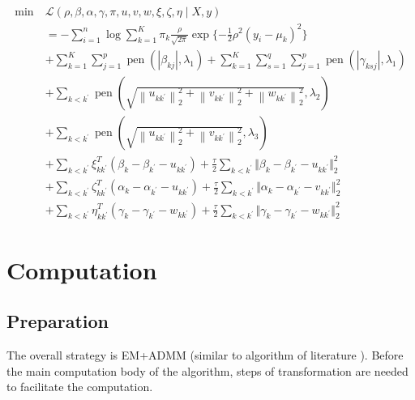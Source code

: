 \documentclass[12pt, a4paper, oneside]{article}
\numberwithin{equation}{section}
\begin{document}
\begin{equation}
	\label{eq:opt-unconstrain}
	\begin{aligned}
		\operatorname{min}\ &\mathcal{L}(\rho, \beta, \alpha, \gamma, \pi, u, v, w, \xi, \zeta, \eta \mid X, y) \\
		&=-\sum_{i=1}^{n} \log \sum_{k=1}^{K} \pi_{k} \frac{\rho}{\sqrt{2\pi}} \exp\{-\frac{1}{2}\rho^2(y_i - \mu_k)^2\} \\
		&+\sum_{k=1}^{K} \sum_{j=1}^{p} \operatorname{pen}\left(\left|\beta_{kj}\right|, \lambda_{1}\right)+\sum_{k=1}^{K} \sum_{s=1}^{q} \sum_{j=1}^{p} \operatorname{pen}\left(\left|\gamma_{ksj}\right|, \lambda_{1}\right) \\
		&+\sum_{k<k^{\prime}} \operatorname{pen}\left(\sqrt{\left\|u_{k{k^\prime}}\right\|_{2}^{2}+\left\|v_{k{k^\prime}}\right\|_{2}^{2}+\left\|w_{k{k^\prime}}\right\|_{2}^{2}}, \lambda_{2}\right) \\
		&+\sum_{k<k^{\prime}} \operatorname{pen}\left(\sqrt{\left\|u_{k{k^\prime}}\right\|_{2}^{2}+\left\|v_{k{k^\prime}}\right\|_{2}^{2}}, \lambda_{3}\right) \\ 
		&+\sum_{k<k^{\prime}}\xi_{k{k^\prime}}^T(\beta_k - \beta_{k^\prime} - u_{k{k^\prime}}) + \frac{\tau}{2}\sum_{k<k^{\prime}}\Vert\beta_k - \beta_{k^\prime} - u_{k{k^\prime}}\Vert_2^2 \\
		&+\sum_{k<k^{\prime}}\zeta_{k{k^\prime}}^T(\alpha_k - \alpha_{k^\prime} - u_{k{k^\prime}}) + \frac{\tau}{2}\sum_{k<k^{\prime}}\Vert\alpha_k - \alpha_{k^\prime} - v_{k{k^\prime}}\Vert_2^2 \\
		&+\sum_{k<k^{\prime}}\eta_{k{k^\prime}}^T(\gamma_k - \gamma_{k^\prime} - w_{k{k^\prime}}) + \frac{\tau}{2}\sum_{k<k^{\prime}}\Vert\gamma_k - \gamma_{k^\prime} - w_{k{k^\prime}}\Vert_2^2 
	\end{aligned}
\end{equation}


\section{Computation} %
\label{sec:computation}

\subsection{Preparation}

The overall strategy is EM+ADMM (similar to algorithm of literature \cite{ggm}). Before the main computation body of the algorithm, steps of transformation are needed to facilitate the computation.
\end{document}
